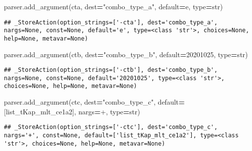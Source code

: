 \documentclass[
]{book}
\newenvironment{Shaded}{\begin{snugshade}}{\end{snugshade}}
\newcommand{\BuiltInTok}[1]{#1}
\newcommand{\NormalTok}[1]{#1}
\newcommand{\OperatorTok}[1]{\textcolor[rgb]{0.81,0.36,0.00}{\textbf{#1}}}
\newcommand{\StringTok}[1]{\textcolor[rgb]{0.31,0.60,0.02}{#1}}
\begin{document}
\begin{Shaded}
\begin{Highlighting}[]
\NormalTok{parser.add\_argument(}\StringTok{\textquotesingle{}{-}cta\textquotesingle{}}\NormalTok{, dest}\OperatorTok{=}\StringTok{"combo\_type\_a"}\NormalTok{, default}\OperatorTok{=}\StringTok{\textquotesingle{}e\textquotesingle{}}\NormalTok{, }\BuiltInTok{type}\OperatorTok{=}\BuiltInTok{str}\NormalTok{)}
\end{Highlighting}
\end{Shaded}

\begin{verbatim}
## _StoreAction(option_strings=['-cta'], dest='combo_type_a', nargs=None, const=None, default='e', type=<class 'str'>, choices=None, help=None, metavar=None)
\end{verbatim}

\begin{Shaded}
\begin{Highlighting}[]
\NormalTok{parser.add\_argument(}\StringTok{\textquotesingle{}{-}ctb\textquotesingle{}}\NormalTok{, dest}\OperatorTok{=}\StringTok{"combo\_type\_b"}\NormalTok{, default}\OperatorTok{=}\StringTok{\textquotesingle{}20201025\textquotesingle{}}\NormalTok{, }\BuiltInTok{type}\OperatorTok{=}\BuiltInTok{str}\NormalTok{)}
\end{Highlighting}
\end{Shaded}

\begin{verbatim}
## _StoreAction(option_strings=['-ctb'], dest='combo_type_b', nargs=None, const=None, default='20201025', type=<class 'str'>, choices=None, help=None, metavar=None)
\end{verbatim}

\begin{Shaded}
\begin{Highlighting}[]
\NormalTok{parser.add\_argument(}\StringTok{\textquotesingle{}{-}ctc\textquotesingle{}}\NormalTok{, dest}\OperatorTok{=}\StringTok{"combo\_type\_c"}\NormalTok{, default}\OperatorTok{=}\NormalTok{[}\StringTok{\textquotesingle{}list\_tKap\_mlt\_ce1a2\textquotesingle{}}\NormalTok{], nargs}\OperatorTok{=}\StringTok{\textquotesingle{}+\textquotesingle{}}\NormalTok{, }\BuiltInTok{type}\OperatorTok{=}\BuiltInTok{str}\NormalTok{)}
\end{Highlighting}
\end{Shaded}

\begin{verbatim}
## _StoreAction(option_strings=['-ctc'], dest='combo_type_c', nargs='+', const=None, default=['list_tKap_mlt_ce1a2'], type=<class 'str'>, choices=None, help=None, metavar=None)
\end{verbatim}
\end{document}
